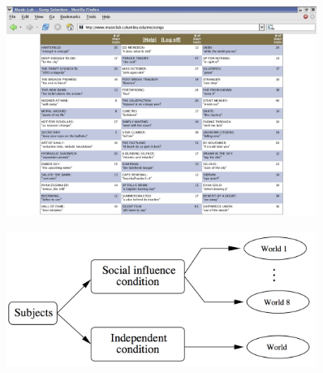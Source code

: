 \documentclass[aspectratio=169]{beamer}
\begin{document}
\begin{frame}

\begin{figure}
  \centering
  \includegraphics[width = 0.9\textwidth]{figures/info-v1-cut}
\end{figure}

\end{frame}
\begin{frame}

\begin{figure}
  \centering
  \includegraphics[width=0.9\textwidth]{figures/musiclab_exp_design}
\end{figure}

\end{frame}
\end{document}
